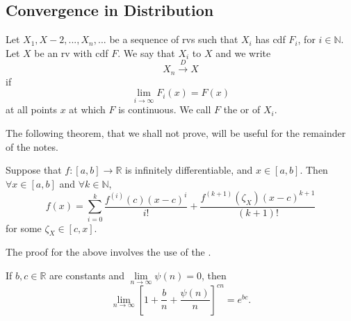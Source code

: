 \documentclass[notoc,notitlepage]{tufte-book}
\begin{document}
\subsection{Convergence in Distribution}%
\label{sub:convergence_in_distribution}

\begin{defn}
\label{defn:convergence_in_distribution}
  Let $X_1, X-2, ..., X_n, ...$ be a sequence of rvs such that $X_i$ has cdf $F_i$, for $i \in \mathbb{N}$. Let $X$ be an rv with cdf $F$. We say that $X_i$  to $X$ and we write
  \begin{equation*}
    X_n \overset{D}{\to} X
  \end{equation*}
  if
  \begin{equation*}
    \lim_{i \to \infty} F_i(x) = F(x)
  \end{equation*}
  at all points $x$ at which $F$ is continuous. We call $F$ the  or  of $X_i$.
\end{defn}

The following theorem, that we shall not prove, will be useful for the remainder of the notes. 

\begin{thm}
\label{thm:taylor_series_with_lagrange_s_remainder}
  Suppose that $f:[a, b] \to \mathbb{R}$ is infinitely differentiable, and $x \in [a, b]$. Then $\forall x \in [a, b]$ and $\forall k \in \mathbb{N}$,
  \begin{equation*}
    f(x) = \sum_{i=0}^{k} \frac{f^{(i)}(c)(x - c)^i}{i!} + \frac{f^{(k + 1)}( \zeta_X )(x - c)^{k + 1}}{(k + 1)!}
  \end{equation*}
  for some $\zeta_X \in [c, x]$.
\end{thm}

The proof for the above involves the use of the .

\begin{thm}
\label{thm:generalized_limit_definition_of_e_}
  If $b, c \in \mathbb{R}$ are constants and $\lim\limits_{n \to \infty} \psi(n) = 0$, then
  \begin{equation*}
    \lim_{n \to \infty} \left[ 1 + \frac{b}{n} + \frac{\psi(n)}{n} \right]^{cn} = e^{bc}.
  \end{equation*}
\end{thm}
\end{document}
